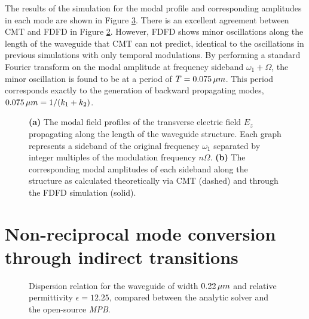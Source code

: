 The results of the simulation for the modal profile and corresponding amplitudes in each mode are shown in Figure \ref{fig:weakMod}. There is an excellent agreement between CMT and FDFD in Figure \ref{sfig:cmtcompare}. However, FDFD shows minor oscillations along the length of the waveguide that CMT can not predict, identical to the oscillations in previous simulations with only temporal modulations. By performing a standard Fourier transform on the modal amplitude at frequency sideband $\omega_1+\Omega$, the minor oscillation is found to be at a period of $T=0.075  \mskip3mu \mu m$. This period corresponds exactly to the generation of backward propagating modes, $0.075  \mskip3mu \mu m = 1/(k_1+k_2)$.


\begin{figure}[h!]
	\centering
	\setlength{\figH}{1\linewidth}
	\setlength{\figW}{1\textwidth}
	\begin{subfigure}[t]{0.5\textwidth}
		
		\label{sfig:weakmod}
	\end{subfigure}%
	\begin{subfigure}[t]{0.5\textwidth}
		
		\label{sfig:cmtcompare}
	\end{subfigure}
	\caption[Electric field profiles for the weakly modulated waveguide]{\textbf{(a)} The modal field profiles of the transverse electric field $E_z$ propagating along the length of the waveguide structure. Each graph represents a sideband of the original frequency $\omega_1$ separated by integer multiples of the modulation frequency $n \Omega$. \textbf{(b)} The corresponding modal amplitudes of each sideband along the structure as calculated theoretically via CMT (dashed) and through the FDFD simulation (solid). }
	\label{fig:weakMod}
\end{figure}

\newpage

\section{Non-reciprocal mode conversion through indirect transitions}
\label{nonrec}
\begin{figure}[b!]	
	\centering
	\setlength{\figH}{\textwidth}
	\setlength{\figW}{\textwidth}
	
	\caption[Dispersion for a waveguide of width $0.22  \mskip3mu \mu m$ and relative permittivity $12.25$.]{Dispersion relation for the waveguide of width $0.22  \mskip3mu \mu m$ and relative permittivity $\epsilon=12.25$, compared between the analytic solver and the open-source \textit{MPB}.}
	\label{fig:bandfinal}
\end{figure} 

